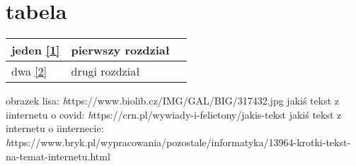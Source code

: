 \documentclass{article}
\begin{document}
\section {tabela}
\begin{tabular}{|l|p{4.7cm}|p{4cm}|} \hline
jeden \ref{1} & pierwszy rozdział \\
\hline
dwa \ref{2} & drugi rozdział\\ \hline
\end{tabular}


\begin{thebibliography}{9}

	obrazek lisa: 
  \emph https://www.biolib.cz/IMG/GAL/BIG/317432.jpg
	jakiś tekst z iinternetu o covid: 
\emph https://crn.pl/wywiady-i-felietony/jakis-tekst
	jakiś tekst z internetu o iinternecie: 
\emph https://www.bryk.pl/wypracowania/pozostale/informatyka/13964-krotki-tekst-na-temat-internetu.html

\end{thebibliography}
\end{document}
